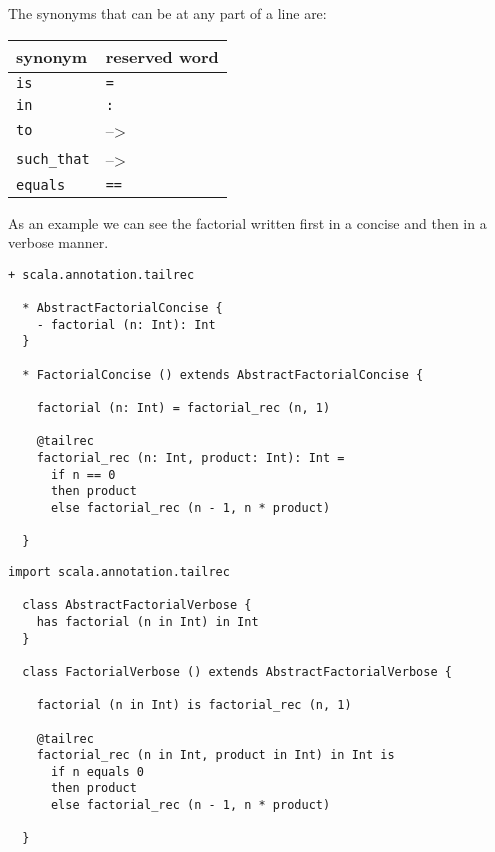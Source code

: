 \documentclass[12pt,a4paper]{article}
\newcommand{\srccode}[1]{\texttt{{#1}}}
\newcommand{\reservedWord}[1]{{\color{blue}\srccode{#1}}\xspace}
\newcommand{\sdef}{\srccode{=}}
\newcommand{\scolon}{\srccode{:}}
\newcommand{\sequalsSign}{\srccode{==}}
\newcommand{\sis}{\reservedWord{is}}
\newcommand{\scin}{\reservedWord{in}}
\newcommand{\sto}{\reservedWord{to}}
\newcommand{\ssuchthat}{\reservedWord{such_that}}
\newcommand{\sequals}{\reservedWord{equals}}
\newcommand{\lambdaSymbol}{{\tiny--\textgreater}}
\begin{document}
    The synonyms that can be at any part of a line are:

    \begin{center}
        \begin{tabular}{|ll|}
            \hline
            \textbf{synonym} & \textbf{reserved word} \\
            \hline
            \sis             & \sdef                  \\
            \hline
            \scin            & \scolon                \\
            \hline
            \sto             & \lambdaSymbol          \\
            \ssuchthat       & \lambdaSymbol          \\
            \hline
            \sequals         & \sequalsSign           \\
            \hline
        \end{tabular}
    \end{center}

    As an example we can see the factorial written first in a concise and then in a verbose manner.

    \begin{lstlisting}[label={lst:exampleFactorialConcise}]
  + scala.annotation.tailrec

  * AbstractFactorialConcise {
    - factorial (n: Int): Int
  }

  * FactorialConcise () extends AbstractFactorialConcise {

    factorial (n: Int) = factorial_rec (n, 1)

    @tailrec
    factorial_rec (n: Int, product: Int): Int =
      if n == 0
      then product
      else factorial_rec (n - 1, n * product)

  }
    \end{lstlisting}


    \begin{lstlisting}[label={lst:exampleFactorialVerbose}]
  import scala.annotation.tailrec

  class AbstractFactorialVerbose {
    has factorial (n in Int) in Int
  }

  class FactorialVerbose () extends AbstractFactorialVerbose {

    factorial (n in Int) is factorial_rec (n, 1)

    @tailrec
    factorial_rec (n in Int, product in Int) in Int is
      if n equals 0
      then product
      else factorial_rec (n - 1, n * product)

  }
    \end{lstlisting}
\end{document}
